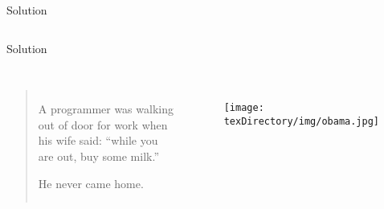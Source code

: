 \documentclass[compress]{beamer}
\begin{document}
\begin{slide}
	\begin{block}{Solution}

	\inputminted[fontsize=\scriptsize, firstline=86, lastline=93, linenos]{c}{
		\resDirectory/daltons.c
	}

	\end{block}
\end{slide}

\begin{slide}
	\begin{block}{Solution}

	\inputminted[fontsize=\scriptsize, firstline=98, lastline=104, linenos]{c}{
		\resDirectory/daltons.c
	}

	\end{block}
\end{slide}

\begin{slide}
	\begin{columns}
	\begin{quotation} \scriptsize \normalfont

A programmer was walking out of door for work when his wife said: ``while you are out, buy some milk.''

He never came home.

	\end{quotation}
	\begin{figure}
	\texttt{[image: \\texDirectory/img/obama.jpg]}
	\end{figure}
	\end{columns}
\end{slide}
\end{document}
